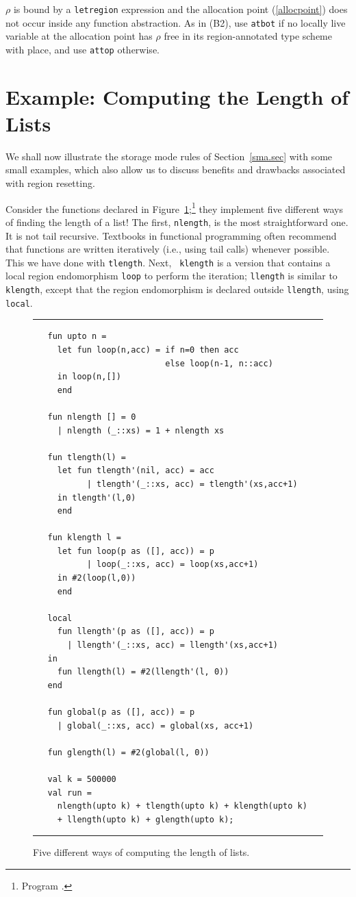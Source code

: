 \documentclass[12pt]{book}
\begin{document}
 $\rho$ is bound by a {\tt letregion} expression
and the allocation point (\ref{allocpoint}) does not occur inside any
function abstraction.  As in (B2), use {\tt atbot} if no locally live
variable at the allocation point has $\rho$ free in its
region-annotated type scheme with place, and use {\tt attop}
otherwise.


\section{Example: Computing the Length of Lists}
\label{length.sec}
We shall now illustrate the storage mode rules of
Section~\ref{sma.sec} with some small examples, which also allow us to
discuss benefits and drawbacks associated with region resetting.

Consider the functions declared in
Figure~\ref{length.fig};\footnote{Program .}
they implement five different ways of finding the length of a list!
The first, {\tt nlength}, is the most straightforward one.  It is not
tail recursive. Textbooks in functional programming often recommend
that functions are written iteratively (i.e., using tail calls)
whenever possible. This we have done with {\tt tlength}.  Next, {\tt
  klength} is a version that contains a local
%
region endomorphism {\tt loop} to perform the iteration; {\tt llength}
is similar to {\tt klength}, except that the region endomorphism is
declared outside {\tt llength}, using 
%
{\tt local}.
\begin{figure}
\hrule
\medskip
\begin{verbatim}
   fun upto n = 
     let fun loop(n,acc) = if n=0 then acc
                           else loop(n-1, n::acc)
     in loop(n,[])
     end

   fun nlength [] = 0
     | nlength (_::xs) = 1 + nlength xs

   fun tlength(l) =
     let fun tlength'(nil, acc) = acc
           | tlength'(_::xs, acc) = tlength'(xs,acc+1)
     in tlength'(l,0)
     end

   fun klength l =
     let fun loop(p as ([], acc)) = p
           | loop(_::xs, acc) = loop(xs,acc+1)
     in #2(loop(l,0))
     end

   local 
     fun llength'(p as ([], acc)) = p
       | llength'(_::xs, acc) = llength'(xs,acc+1)
   in
     fun llength(l) = #2(llength'(l, 0))
   end

   fun global(p as ([], acc)) = p
     | global(_::xs, acc) = global(xs, acc+1)

   fun glength(l) = #2(global(l, 0))

   val k = 500000
   val run = 
     nlength(upto k) + tlength(upto k) + klength(upto k) 
     + llength(upto k) + glength(upto k);
\end{verbatim}
\caption{Five different ways of computing the length of lists.}
\bigskip
\label{length.fig}
\hrule
\end{figure}
\end{document}
